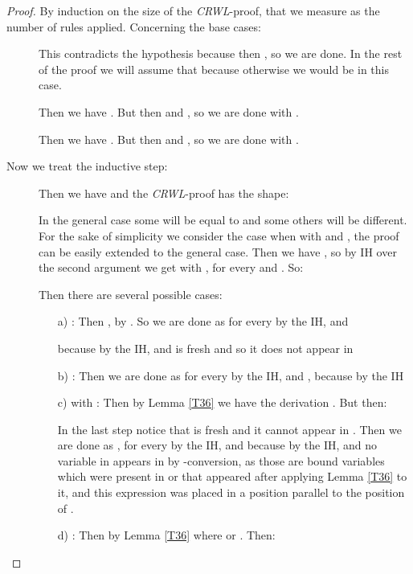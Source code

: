 \begin{proof}\label{DEMO_T32}
By induction on the size  of the {\it CRWL}-proof, that we measure as the number of  rules applied. Concerning the base cases:
\begin{description}
  \item[] This contradicts the hypothesis because then , so we are done. In the rest of the proof we will assume that  because otherwise we would be in this case.

  \item[] Then we have . But then  and
  , so we are done with .

  \item[] Then we have . But then  and
      , so we are done with .
\end{description}

Now we treat the inductive step:
\begin{description}
 \item[] Then we have  and the
    {\it CRWL}-proof has the shape:
    
    In the general case some  will be equal to  and some others will be different. For the sake of simplicity we consider the case when  with  and , the proof can be easily extended to the general case.
Then  we have , so by IH over the second
    argument we get 
    with ,  for every  and
    . So:
    
    Then there are several possible cases:
\begin{enumerate}
    \item[a)] : Then
    , by
    . So we are done as   for every
     by the IH,  and
 
    because
     by the IH, and  is fresh and
    so it does not appear in \item[b)] : Then we are done as 
    for every  by the IH, and ,
    because  by the IH\item[c)]  with : 
Then by Lemma \ref{T36} we have the derivation .
But then:
    
    In the last step notice that  is fresh and it cannot appear in . Then we are done as ,  for every  by the IH, and  
because  by the IH, and no variable in  appears in  by -conversion, as those are bound variables which were present in  or that appeared after applying Lemma \ref{T36} to it, and this expression was placed in a position parallel to the position of .\item[d)] : Then by Lemma \ref{T36}  where  or . Then:



\end{enumerate}
\end{description}
\end{proof}
